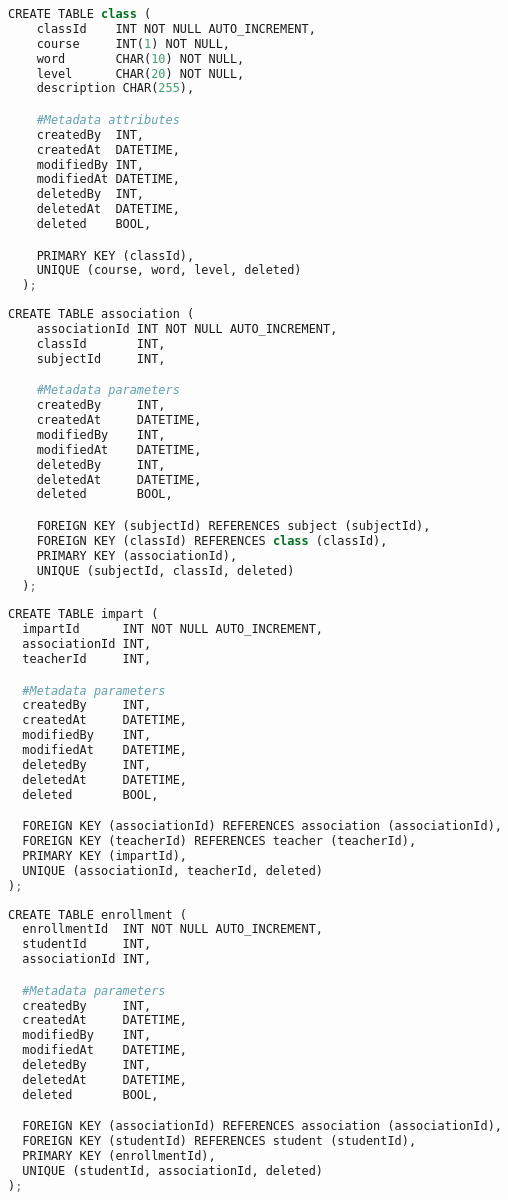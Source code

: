 \begin{lstlisting}[language=python,frame=none]
  CREATE TABLE class (
    classId    INT NOT NULL AUTO_INCREMENT,
    course     INT(1) NOT NULL,
    word       CHAR(10) NOT NULL,
    level      CHAR(20) NOT NULL,
    description CHAR(255),

    #Metadata attributes
    createdBy  INT,
    createdAt  DATETIME,
    modifiedBy INT,
    modifiedAt DATETIME,
    deletedBy  INT,
    deletedAt  DATETIME,
    deleted    BOOL,

    PRIMARY KEY (classId),
    UNIQUE (course, word, level, deleted)
  );
\end{lstlisting}

\begin{lstlisting}[language=python,frame=none]
  CREATE TABLE association (
    associationId INT NOT NULL AUTO_INCREMENT,
    classId       INT,
    subjectId     INT,

    #Metadata parameters
    createdBy     INT,
    createdAt     DATETIME,
    modifiedBy    INT,
    modifiedAt    DATETIME,
    deletedBy     INT,
    deletedAt     DATETIME,
    deleted       BOOL,

    FOREIGN KEY (subjectId) REFERENCES subject (subjectId),
    FOREIGN KEY (classId) REFERENCES class (classId),
    PRIMARY KEY (associationId),
    UNIQUE (subjectId, classId, deleted)
  );
\end{lstlisting}

\begin{lstlisting}[language=python,frame=none]
CREATE TABLE impart (
  impartId      INT NOT NULL AUTO_INCREMENT,
  associationId INT,
  teacherId     INT,

  #Metadata parameters
  createdBy     INT,
  createdAt     DATETIME,
  modifiedBy    INT,
  modifiedAt    DATETIME,
  deletedBy     INT,
  deletedAt     DATETIME,
  deleted       BOOL,

  FOREIGN KEY (associationId) REFERENCES association (associationId),
  FOREIGN KEY (teacherId) REFERENCES teacher (teacherId),
  PRIMARY KEY (impartId),
  UNIQUE (associationId, teacherId, deleted)
);
\end{lstlisting}

\begin{lstlisting}[language=python,frame=none]
CREATE TABLE enrollment (
  enrollmentId  INT NOT NULL AUTO_INCREMENT,
  studentId     INT,
  associationId INT,

  #Metadata parameters
  createdBy     INT,
  createdAt     DATETIME,
  modifiedBy    INT,
  modifiedAt    DATETIME,
  deletedBy     INT,
  deletedAt     DATETIME,
  deleted       BOOL,

  FOREIGN KEY (associationId) REFERENCES association (associationId),
  FOREIGN KEY (studentId) REFERENCES student (studentId),
  PRIMARY KEY (enrollmentId),
  UNIQUE (studentId, associationId, deleted)
);
\end{lstlisting}
